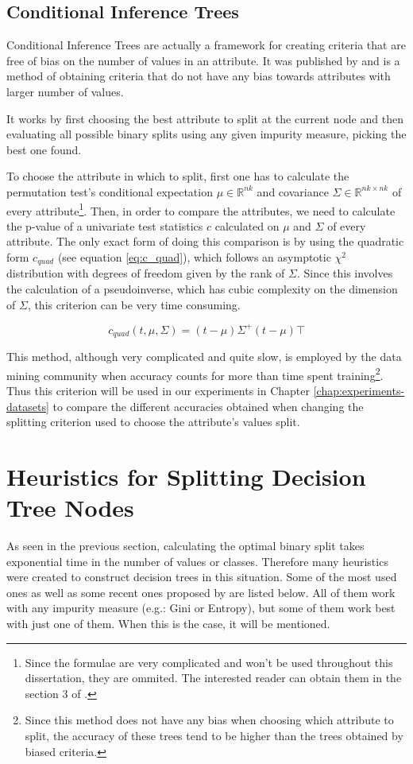 \subsection{Conditional Inference Trees}
Conditional Inference Trees are actually a framework for creating criteria that are free of bias on the number of values in an attribute. It was published by \cite{Hothorn:2006:URP} and is a method of obtaining criteria that do not have any bias towards attributes with larger number of values.

It works by first choosing the best attribute to split at the current node and then evaluating all possible binary splits using any given impurity measure, picking the best one found.

To choose the attribute in which to split, first one has to calculate the permutation test's conditional expectation $\mu \in \mathbb{R}^{nk}$ and covariance $\Sigma \in \mathbb{R}^{nk\times nk}$ of every attribute\footnote{Since the formulae are very complicated and won't be used throughout this dissertation, they are ommited. The interested reader can obtain them in the section 3 of  \cite{Hothorn:2006:URP}.}. Then, in order to compare the attributes, we need to calculate the p-value of a univariate test statistics $c$ calculated on $\mu$ and $\Sigma$ of every attribute. The only exact form of doing this comparison is by using the quadratic form $c_{quad}$ (see equation \ref{eq:c_quad}), which follows an asymptotic $\chi^2$ distribution with degrees of freedom given by the rank of $\Sigma$. Since this involves the calculation of a pseudoinverse, which has cubic complexity on the dimension of $\Sigma$, this criterion can be very time consuming.

\begin{equation}
\label{eq:c_quad}
c_{quad}(t, \mu, \Sigma) = (t-\mu)\Sigma^+(t-\mu)\top
\end{equation}

This method, although very complicated and quite slow, is employed by the data mining community when accuracy counts for more than time spent training\footnote{Since this method does not have any bias when choosing which attribute to split, the accuracy of these trees tend to be higher than the trees obtained by biased criteria.}. Thus this criterion will be used in our experiments in Chapter \ref{chap:experiments-datasets} to compare the different accuracies obtained when changing the splitting criterion used to choose the attribute's values split.

\section{Heuristics for Splitting Decision Tree Nodes}
\label{sec:heuristics}
As seen in the previous section, calculating the optimal binary split takes exponential time in the number of values or classes. Therefore many heuristics were created to construct decision trees in this situation. Some of the most used ones as well as 
some recent ones proposed by \cite{icml2018} are listed below. All of them work with any impurity measure (e.g.: Gini or Entropy), but some of them work best with just one of them. When this is the case, it will be mentioned.

